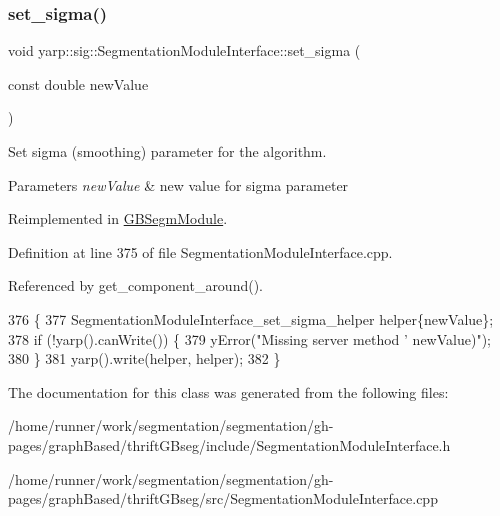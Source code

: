 \subsubsection{\texorpdfstring{set\+\_\+sigma()}{set\_sigma()}}
{\footnotesize\ttfamily void yarp\+::sig\+::\+Segmentation\+Module\+Interface\+::set\+\_\+sigma (\begin{DoxyParamCaption}\item[{const double}]{new\+Value }\end{DoxyParamCaption})\hspace{0.3cm}{\ttfamily [virtual]}}



Set sigma (smoothing) parameter for the algorithm. 


\begin{DoxyParams}{Parameters}
{\em new\+Value} & new value for sigma parameter \\
\hline
\end{DoxyParams}


Reimplemented in \hyperlink{classGBSegmModule_a27ffe08d394d321d9f9441423d36ef5e}{G\+B\+Segm\+Module}.



Definition at line 375 of file Segmentation\+Module\+Interface.\+cpp.



Referenced by get\+\_\+component\+\_\+around().


\begin{DoxyCode}
376 \{
377     SegmentationModuleInterface\_set\_sigma\_helper helper\{newValue\};
378     \textcolor{keywordflow}{if} (!yarp().canWrite()) \{
379         yError(\textcolor{stringliteral}{"Missing server method '%
       newValue)"});
380     \}
381     yarp().write(helper, helper);
382 \}
\end{DoxyCode}


The documentation for this class was generated from the following files\+:\begin{DoxyCompactItemize}
\item 
/home/runner/work/segmentation/segmentation/gh-\/pages/graph\+Based/thrift\+G\+Bseg/include/Segmentation\+Module\+Interface.\+h\item 
/home/runner/work/segmentation/segmentation/gh-\/pages/graph\+Based/thrift\+G\+Bseg/src/Segmentation\+Module\+Interface.\+cpp\end{DoxyCompactItemize}
